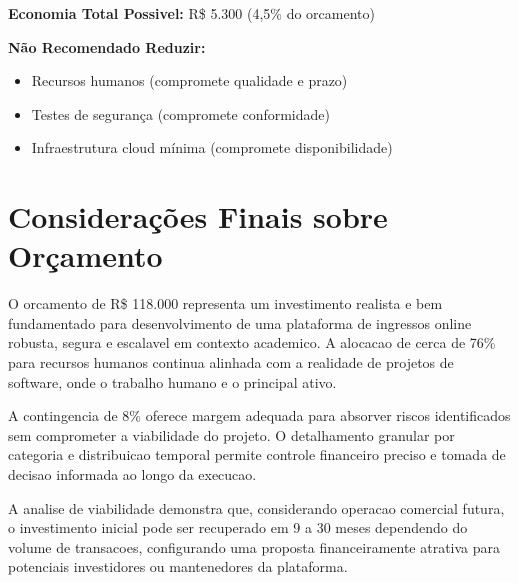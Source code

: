 \textbf{Economia Total Possivel:} R\$ 5.300 (4,5\% do orcamento)

\textbf{Não Recomendado Reduzir:}
\begin{itemize}
    \item Recursos humanos (compromete qualidade e prazo)
    \item Testes de segurança (compromete conformidade)
    \item Infraestrutura cloud mínima (compromete disponibilidade)
\end{itemize}

\section{Considerações Finais sobre Orçamento}

O orcamento de R\$ 118.000 representa um investimento realista e bem fundamentado para desenvolvimento de uma plataforma de ingressos online robusta, segura e escalavel em contexto academico. A alocacao de cerca de 76\% para recursos humanos continua alinhada com a realidade de projetos de software, onde o trabalho humano e o principal ativo.

A contingencia de 8\% oferece margem adequada para absorver riscos identificados sem comprometer a viabilidade do projeto. O detalhamento granular por categoria e distribuicao temporal permite controle financeiro preciso e tomada de decisao informada ao longo da execucao.

A analise de viabilidade demonstra que, considerando operacao comercial futura, o investimento inicial pode ser recuperado em 9 a 30 meses dependendo do volume de transacoes, configurando uma proposta financeiramente atrativa para potenciais investidores ou mantenedores da plataforma.
